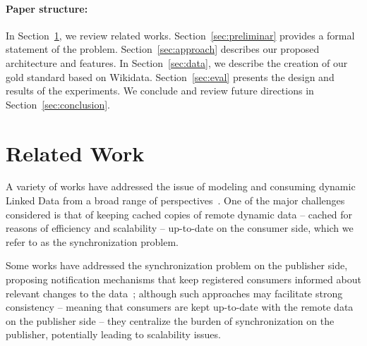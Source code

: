 \documentclass[runningheads]{llncs}
\begin{document}
\paragraph{Paper structure:} In Section~\ref{sec:related}, we review related works. Section~\ref{sec:preliminar} provides a formal statement of the problem. Section~\ref{sec:approach} describes our proposed architecture and features. In Section~\ref{sec:data}, we describe the creation of our gold standard based on Wikidata. Section~\ref{sec:eval} presents the design and results of the experiments. We conclude and review future directions in Section~\ref{sec:conclusion}.

%
\section{Related Work}
\label{sec:related}
%

A variety of works have addressed the issue of modeling and consuming dynamic Linked Data from a broad range of perspectives~\cite{PassantM10,TrampFEA10,UmbrichHHPD10,UmbrichKL10,KaferAUOH13,DividinoSGG13,DividinoKG14,Kjernsmo15,NishiokaS16,GonzalezH18}. One of the major challenges considered is that of keeping cached copies of remote dynamic data -- cached for reasons of efficiency and scalability -- up-to-date on the consumer side, which we refer to as the synchronization problem.

Some works have addressed the synchronization problem on the publisher side, proposing notification mechanisms that keep registered consumers informed about relevant changes to the data~\cite{MissierACDG07,PassantM10,TrampFEA10,MaderMS14,webSub18}; although such approaches may facilitate strong consistency -- meaning that consumers are kept up-to-date with the remote data on the publisher side -- they centralize the burden  of synchronization on the publisher, potentially leading to scalability issues. 
\end{document}
